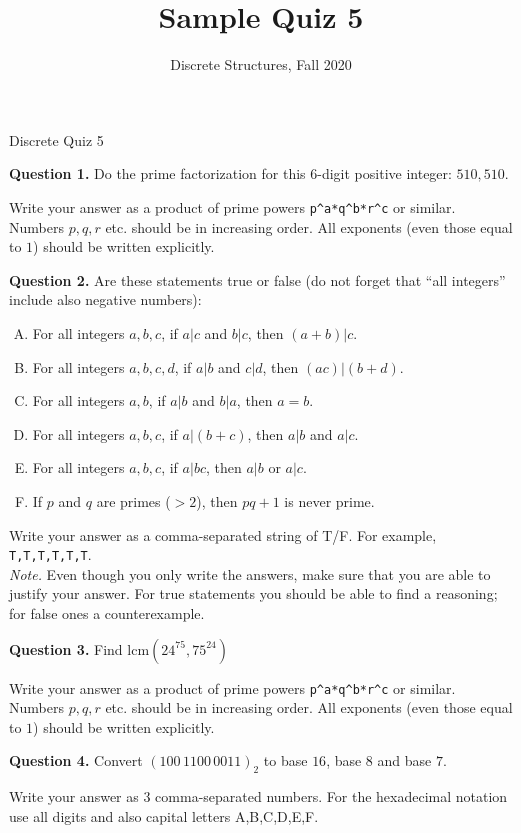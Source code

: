 \documentclass[jou]{apa6}
\title{Sample Quiz 5}
\author{Discrete Structures, Fall 2020}
\affiliation{RBS}
\begin{document}
\thispagestyle{empty}

\twocolumn
{\Large Discrete Quiz 5}

\vspace{6pt}
{\bf Question 1.} Do the prime factorization for this 6-digit positive integer: 
$510,510$. 

Write your answer as a product of prime powers {\tt p\^{}a*q\^{}b*r\^{}c} or similar. 
Numbers $p,q,r$ etc. should be in increasing order. All exponents (even those equal to $1$) should be written explicitly.


\vspace{6pt}
{\bf Question 2.} Are these statements true or false (do not forget that ``all integers'' include also negative numbers):
\begin{enumerate}[(A)] 
\item For all integers $a,b,c$, if $a|c$ and $b|c$, then $(a + b)|c$.
\item For all integers $a,b,c,d$, if $a|b$ and $c|d$, then $(ac)|(b + d)$.
\item For all integers $a,b$, if $a|b$ and $b|a$, then $a = b$.
\item For all integers $a,b,c$, if $a|(b + c)$, then $a|b$ and $a|c$.
\item For all integers $a,b,c$, if $a|bc$, then $a|b$ or $a|c$.
\item If $p$ and $q$ are primes ($> 2$), then $pq + 1$ is never prime.
\end{enumerate}

Write your answer as a comma-separated string of T/F. For example, {\tt T,T,T,T,T,T}.\\
{\em Note.} Even though you only write the answers, 
make sure that you are able to justify your answer. For true statements you should be able to 
find a reasoning; for false ones \textendash{} a counterexample. 


\vspace{6pt}
{\bf Question 3.} Find $\text{lcm}(24^{75},75^{24})$ 

Write your answer as a product of prime powers {\tt p\^{}a*q\^{}b*r\^{}c} or similar. 
Numbers $p,q,r$ etc. should be in increasing order. All exponents (even those equal to $1$) should be written explicitly.


\vspace{6pt}
{\bf Question 4.}
Convert $(100\,1100\,0011)_2$ to base $16$, base $8$ and base $7$. 

Write your answer as $3$ comma-separated numbers. For the hexadecimal notation use all digits and also capital letters A,B,C,D,E,F.
\end{document}
